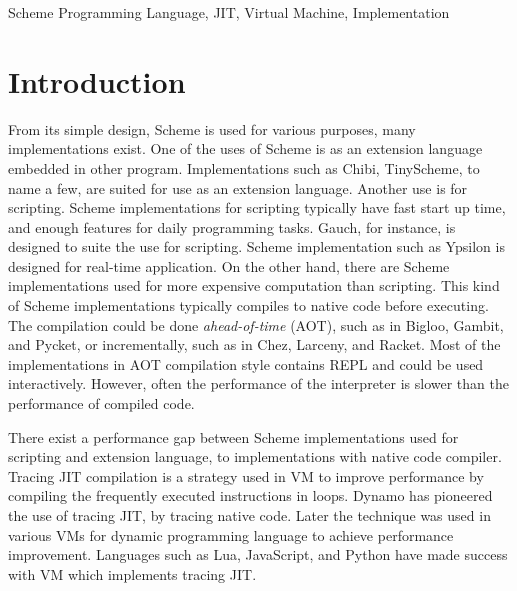 \documentclass[preprint, numbers]{sigplanconf}
\begin{document}


\keywords
Scheme Programming Language, JIT, Virtual Machine, Implementation

\section{Introduction}

From its simple design, Scheme is used for various purposes, many
implementations exist. One of the uses of Scheme is as an extension language
embedded in other program. Implementations such as Chibi\cite{shinn2011chibi},
TinyScheme\cite{souflis2012tinyscheme}, to name a few, are suited for use as
an extension language. Another use is for scripting. Scheme implementations
for scripting typically have fast start up time, and enough features for daily
programming tasks. Gauch\cite{kawai2001gauche}, for instance, is designed to
suite the use for scripting. Scheme implementation such as
Ypsilon\cite{fujita2008ypsilon} is designed for real-time application. On the
other hand, there are Scheme implementations used for more expensive
computation than scripting. This kind of Scheme implementations typically
compiles to native code before executing. The compilation could be done
\textit{ahead-of-time} (AOT), such as in Bigloo\cite{serrano1995bigloo},
Gambit\cite{feeleygambit}, and Pycket\cite{bauman2015pycket}, or
incrementally, such as in Chez\cite{dybvigchez}, Larceny\cite{hansenlarceny},
and Racket\cite{racketlang}.  Most of the implementations in AOT compilation
style contains REPL and could be used interactively. However, often the
performance of the interpreter is slower than the performance of compiled
code.

There exist a performance gap between Scheme implementations used for
scripting and extension language, to implementations with native code
compiler. Tracing JIT compilation is a strategy used in VM to improve
performance by compiling the frequently executed instructions in
loops. Dynamo\cite{bala2000dynamo} has pioneered the use of tracing JIT, by
tracing native code. Later the technique was used in various VMs for dynamic
programming language to achieve performance improvement. Languages such as
Lua\cite{pall2008luajit}, JavaScript\cite{gal2009trace}, and
Python\cite{bolz2009tracing} have made success with VM which implements
tracing JIT.\@
\end{document}
